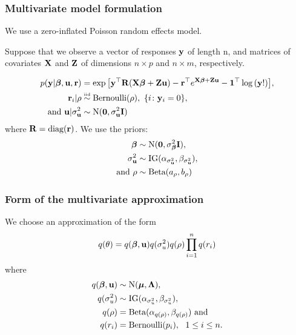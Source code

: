 \documentclass{beamer}
\begin{document}
\begin{frame}
	\frametitle{Multivariate model formulation}
	We use a zero-inflated Poisson random effects model.
	
	\medskip
	
	Suppose that we observe a vector of responses ${\bf y}$ of length n, and matrices
	of covariates ${\bf X}$ and ${\bf Z}$ of dimensions $n \times p$ and $n \times m$,
	respectively.
	
	\begin{align*}
		p({\bf y}|{\boldsymbol \beta}, {\bf u}, {\bf r})       & = \exp{\left[{\bf y}^\top {\bf R}({\bf X}{\boldsymbol\beta}+ {\bf Z}{\bf u}) - {\bf r}^\top e^{{\bf X}{\boldsymbol\beta}+ {\bf Z}{\bf u}} - {\bf1}^\top \log{({\bf y}!)}\right]}, \\
		{\bf r}_i|\rho                    & \stackrel{\mbox{\tiny iid}}{\sim} \text{Bernoulli}(\rho), \ \{i \colon {\bf y}_i=0\},                \\
		\text{and }{\bf u}|\sigma_{{\bf u}}^2 & \sim \text{N}({\bf 0}, \sigma_{{\bf u}}^2 {\bf I})                                                             \\
	\end{align*}
	\noindent where ${\bf R} =\mbox{diag}({\bf r})$.
	We use the priors:
	\begin{align*}
		{\boldsymbol\beta}          & \sim \text{N}({\bf 0}, \sigma_{\boldsymbol \beta}^2{\bf I}),                  \\
		\sigma_{\bf u}^2    & \sim \text{IG}(\alpha_{\sigma_{\bf u}^2}, \beta_{\sigma_{\bf u}^2}), \\
		\text{and }\rho & \sim \text{Beta}(a_\rho, b_\rho)                             \\
	\end{align*}
\end{frame}

\begin{frame}
	\frametitle{Form of the multivariate approximation}
	We choose an approximation of the form
	$$
	q(\theta) = q({\boldsymbol \beta}, {\bf u}) q(\sigma_u^2) q(\rho) \prod_{i=1}^n q(r_i)
	$$
	where
	\begin{align*}
		q({\boldsymbol \beta}, {\bf u}) & \sim \text{N}({\boldsymbol \mu}, {\boldsymbol \Lambda}),                               \\
		q(\sigma_u^2)  & \sim \text{IG}(\alpha_{\sigma_u^2}, \beta_{\sigma_u^2}),     \\
		q(\rho)        & = \text{Beta}(\alpha_{q(\rho)}, \beta_{q(\rho)}) \text{ and} \\
		q(r_i)         & = \text{Bernoulli}(p_i), \ \ 1 \leq i \leq n.                
	\end{align*}
\end{frame}
\end{document}
